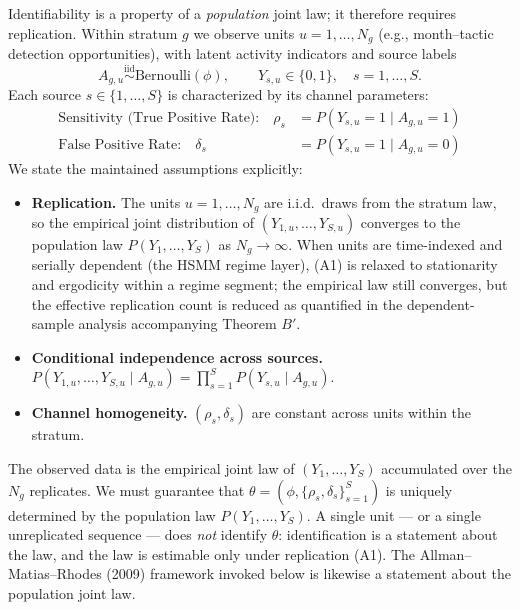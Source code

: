 \documentclass[11pt,a4paper]{article}
\begin{document}
Identifiability is a property of a \emph{population} joint law; it therefore requires replication. Within stratum $g$ we observe units $u = 1, \dots, N_g$ (e.g., month--tactic detection opportunities), with latent activity indicators and source labels
\[
A_{g,u} \overset{\text{iid}}{\sim} \mathrm{Bernoulli}(\phi), \qquad Y_{s,u} \in \{0,1\}, \quad s = 1, \dots, S. %
\]
Each source $s \in \{1, \dots, S\}$ is characterized by its channel parameters:
\begin{align*}
    \text{Sensitivity (True Positive Rate):} \quad \rho_s &= P(Y_{s,u} = 1 \mid A_{g,u} = 1) \\
    \text{False Positive Rate:} \quad \delta_s &= P(Y_{s,u} = 1 \mid A_{g,u} = 0)
\end{align*}
We state the maintained assumptions explicitly:
\begin{itemize}
    \item[(A1)] \textbf{Replication.} The units $u = 1, \dots, N_g$ are i.i.d.\ draws from the stratum law, so the empirical joint distribution of $(Y_{1,u}, \dots, Y_{S,u})$ converges to the population law $P(Y_1, \dots, Y_S)$ as $N_g \to \infty$. When units are time-indexed and serially dependent (the HSMM regime layer), (A1) is relaxed to stationarity and ergodicity within a regime segment; the empirical law still converges, but the effective replication count is reduced as quantified in the dependent-sample analysis accompanying Theorem $B'$. %
    \item[(A2)] \textbf{Conditional independence across sources.} $P(Y_{1,u}, \dots, Y_{S,u} \mid A_{g,u}) = \prod_{s=1}^{S} P(Y_{s,u} \mid A_{g,u})$. %
    \item[(A3)] \textbf{Channel homogeneity.} $(\rho_s, \delta_s)$ are constant across units within the stratum. %
\end{itemize}
The observed data is the empirical joint law of $(Y_1, \dots, Y_S)$ accumulated over the $N_g$ replicates. We must guarantee that $\theta = (\phi, \{\rho_s, \delta_s\}_{s=1}^S)$ is uniquely determined by the population law $P(Y_1, \dots, Y_S)$. A single unit --- or a single unreplicated sequence --- does \emph{not} identify $\theta$: identification is a statement about the law, and the law is estimable only under replication (A1). The Allman--Matias--Rhodes (2009) framework invoked below is likewise a statement about the population joint law. %
\end{document}
